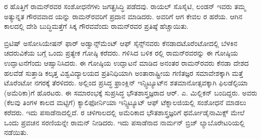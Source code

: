 ರ ಹೊತ್ತಿಗೆ ರಾಮನ್‍ರವರ ಸಂಶೋಧನೆಗಳು ಜಗತ್ಪ್ರಸಿದ್ಧಿ ಪಡೆದವು. ರಾಯಲ್ ಸೊಸೈಟಿ, ಲಂಡನ್ \enginline{-} ಇವರು ತಮ್ಮ ಅತ್ಯುನ್ನತ ಗೌರವವಾದ  ಯನ್ನು ರಾಮನ್‍ರವರಿಗೆ ಪ್ರದಾನ ಮಾಡಿದರು. ಅವರಿಗೆ ಆಗ ಕೇವಲ ರ ಹರೆಯ. ಆಗಿನ ಕಾಲದಲ್ಲಿ ದೇಶಿ ಬುದ್ಧಿಮತ್ತೆಗೆ ಸಿಕ್ಕ ಗೌರವವೆಂದು ರಾಮನ್‍ರವರ ಪ್ರತಿಷ್ಠೆ ಹೆಚ್ಚಾಯಿತು.



ಬ್ರಿಟಿಷ್ ಅಸೋಸಿಯೇಷನ್ ಫಾರ್ ಅಡ್ವಾನ್ಸ್‌ಮೆಂಟ್ ಆಫ್ ಸೈನ್ಸ್‌ನವರು ಕೆನಡಾದ\break ಟೊರೆಂಟೋದಲ್ಲಿ ಬೆಳಕಿನ ಚದರುವಿಕೆಯ ಬಗ್ಗೆ ಒಂದು ಪ್ರತ್ಯೇಕ ಗೋಷ್ಠಿ ಕರೆದರು.  ಗಳಿಸಿದ ಬಳಿಕ ರಲ್ಲಿ ರಾಮನ್‍ರವರನ್ನು ಈ ಗೋಷ್ಠಿಯ ಉದ್ಘಾಟನೆಗೆಂದು ಆಹ್ವಾನಿಸಿದರು. ಈ ಗೋಷ್ಠಿಯ ಉದ್ಘಾಟನೆ ಮಾಡಿದ ಅನಂತರ ರಾಮನ್‍ರವರು ಕೆನಡಾ ದೇಶದ ಹಲವೆಡೆ ಸುತ್ತಾಡಿ ಕಲ್ಕತ್ತ ವಿಶ್ವವಿದ್ಯಾಲಯದ ಪ್ರತಿನಿಧಿಯಾಗಿ ಅಂತಾರಾಷ್ಟ್ರೀಯ ಗಣಿತಜ್ಞರ ಸಮಾವೇಶಕ್ಕಾಗಿ ಮತ್ತೆ ಟೊರೆಂಟೋ ನಗರಕ್ಕೆ ತೆರಳಿದರು. ಅಲ್ಲಿಂದ ಪ್ರಸಿದ್ಧ ಫ್ರಾಂಕ್ಲಿನ್ ಇನ್ಸ್ಟಿಟ್ಯೂಟ್‍ನ ಶತಮಾನೋತ್ಸವಕ್ಕಾಗಿ ಫಿಲಡೆಲ್ಫಿಯಾ (ಅಮೆರಿಕಾ)ಗೆ ಹೊರಟರು. ಈ ಸಮಾರಂಭಕ್ಕೆ ಸುಪ್ರಸಿದ್ಧ ಭೌತಶಾಸ್ತ್ರಜ್ಞರಾದ ಆರ್. ಎ. ಮಿಲ್ಲಿಕನ್ ಬಂದಿದ್ದರು. ಅವರು (ಕೆಲವು ತಿಂಗಳ ಕಾಲದ ಮಟ್ಟಿಗೆ) ಕ್ಯಾಲಿಫೋರ್ನಿಯಾ ಇನ್ಸ್ಟಿಟ್ಯೂಟ್ ಆಫ್ ಟೆಕ್ನಾಲಜಿಯಲ್ಲಿ ಸಂಶೋಧನೆ ಮಾಡಲು ಕರೆದರು. ಇದು ಪಸಾಡೆನಾದಲ್ಲಿದೆ. ರ ಚಳಿಗಾಲದಲ್ಲಿ ಅಮೆರಿಕಾದ ಭೌತಶಾಸ್ತ್ರಜ್ಞರಿಗೆ ಥರ್ಮೋಡೈನಾಮಿಕ್ಸ್ ಮೇಲೆ ಒಂದು ಪ್ರವಚನ ಸರಣಿಯನ್ನೇ ರಾಮನ್ ನೀಡಿದರು. ಇದು ಪಸಾಡೆನಾದ ನಾರ್ಮನ್ ಬ್ರಿಜ್ ಲ್ಯಾಬೊರೇಟರಿಯಲ್ಲಿ ನಡೆಯಿತು.

